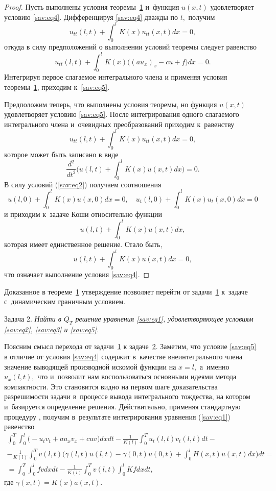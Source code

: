 \rm

\smallskip


\begin{proof} Пусть выполнены условия теоремы~\hyperlink{sav:th1}{1} и~функция $u(x,t)$ удовлетворяет
условию \eqref{sav:eq4}. 
Дифференцируя \eqref{sav:eq4} дважды по $t,$ получим 
$$u_{tt}(l,t)+ \int _0^lK(x)u_{tt}(x,t)dx=0,$$
откуда в силу предположений о выполнении условий теоремы следует равенство
 $$u_{tt}(l,t)+ \int _0^lK(x)\bigl((au_x)_x-cu+f\bigr)dx=0.$$
Интегрируя первое слагаемое интегрального члена и применяя условия теоремы~\hyperlink{sav:th1}{1}, приходим к~\eqref{sav:eq5}.

Предположим теперь, что выполнены условия теоремы, но  функция $u(x,t)$ удовлетворяет условию \eqref{sav:eq5}. 
После интегрирования одного слагаемого интегрального члена и~очевидных преобразований приходим к~равенству
$$
u_{tt}(l,t)+ \int _0^lK(x)u_{tt}(x,t)dx=0,
$$
которое может быть записано в виде
$$
\frac{d^2}{dt^2}\biggl( u(l,t)+ \int _0^lK(x)u(x,t)dx\biggr)=0.
$$
В силу условий (\ref{sav:eq2}) получаем соотношения
$$
u(l, 0)+ \int _0^lK(x) u(x, 0)dx=0, \quad 
u_t(l, 0)+ \int _0^lK(x)u_t(x, 0)dx=0
$$
и приходим к~задаче Коши относительно функции 
$$ u(l,t)+ \int _0^lK(x)u(x,t)dx,$$
которая имеет единственное решение.
Стало быть, 
$$ u(l,t)+ \int _0^lK(x)u(x,t)dx=0,$$
что означает выполнение условия \eqref{sav:eq4}. 
\end{proof}

\smallskip

Доказанное в теореме~\hyperlink{sav:th1}{1} утверждение позволяет перейти от задачи~\hyperlink{sav:task1}{1} к~задаче
с~динамическим граничным условием.

\smallskip

\hypertarget{sav:task2}{}
{\small\sc Задача 2.} \it  Найти в  $Q_T$ решение уравнения  \rm \eqref{sav:eq1}, \it удовлетворяющее
условиям \rm \eqref{sav:eq2}, \eqref{sav:eq3} и \eqref{sav:eq5}.

\smallskip

Поясним смысл перехода от задачи~\hyperlink{sav:task1}{1} к задаче~\hyperlink{sav:task2}{2}. 
Заметим, что условие \eqref{sav:eq5} в отличие от условия \eqref{sav:eq4} содержит в~качестве внеинтегрального члена значение выводящей производной искомой функции на $x=l,$ а~именно $u_x(l,t),$ что и~позволит нам воспользоваться основными идеями метода компактности. 
Это становится видно на первом шаге доказательства разрешимости задачи в~процессе вывода интегрального тождества, на котором и~базируется определение решения. 
Действительно, применяя стандартную процедуру \cite{pulkinals:bib:lad}, получим в~результате интегрирования уравнения (\ref{sav:eq1}) равенство
\begin{multline}
\int _0^T \int _0^l \bigl(-u_tv_t+au_xv_x+cuv\bigr)dxdt-
\frac{1}{K(l)} \int _0^Tu_t(l,t)v_t(l,t)dt-
\\
-\frac{1}{K(l)}
 \int _0^Tv(l,t) \biggl(\gamma(l,t)u(l,t)-
\gamma(0,t)u(0,t)+ \int _0^lH(x,t)u(x,t)dx \biggr)dt=
\\
 \label{ph4}
= \int _0^T \int _0^lfvdxdt-
\frac{1}{K(l)} \int _0^Tv(l,t) \int _0^lKfdxdt,
\end{multline}
где 
$\gamma(x,t)=K(x)a(x,t).$


